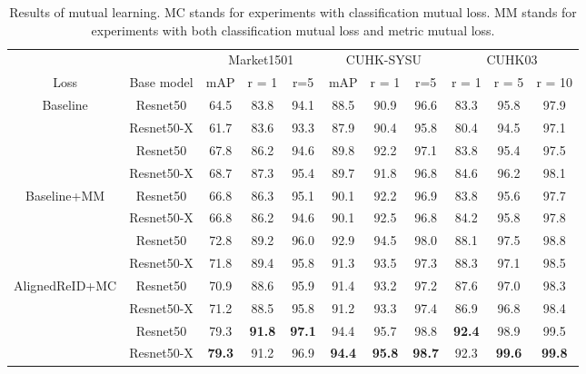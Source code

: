 \documentclass[10pt,twocolumn,letterpaper]{article}
\begin{document}
\renewcommand{\multirowsetup}{\centering}  
\begin{table*}[t]\small
  \begin{center}
  \begin{tabular}{ c|c|ccc|ccc|ccc}
\hline
    							&	 		& \multicolumn{3}{c|}{Market1501} & \multicolumn{3}{c|}{CUHK-SYSU}	& \multicolumn{3}{c}{CUHK03}	\\
  Loss						&Base model		& mAP 	& r = 1	&r=5 & mAP 	& r = 1	&r=5 & r = 1	&r = 5    &r = 10\\
 	\hline
	\hline
 \multirow{3}{2.3cm}{Baseline} 		&Resnet50	&64.5 	&83.8	&94.1	&88.5	&90.9	&96.6	&83.3	&95.8	&97.9	\\
   										&Resnet50-X	&61.7	&83.6	&93.3	&87.9 	&90.4	&95.8	&80.4	&94.5	&97.1	\\
   \hline
 \multirow{3}{2.3cm}{Baseline+MC} 	&Resnet50	&67.8  	& 86.2	& 94.6  & 89.8 	& 92.2	& 97.1	& 83.8 	& 95.4	& 97.5	\\
   										&Resnet50-X	&68.7 	&87.3	& 95.4	& 89.7 	& 91.8	& 96.8	& 84.6 	& 96.2	& 98.1   \\
   \hline
 \multirow{3}{2.3cm}{Baseline+MM}	&Resnet50	& 66.8 	& 86.3	&95.1	& 90.1 	& 92.2	& 96.9	& 83.8	&95.6 	&97.7\\
 	  						&Resnet50-X	& 66.8 	& 86.2	&94.6	& 90.1 	& 92.5	& 96.8	& 84.2	&95.8 	&97.8\\
 	\hline
	\hline
 \multirow{3}{2.3cm}{AlignedReID} 	&Resnet50	&72.8   &89.2   &96.0   &92.9   &94.5	&98.0	&88.1	&97.5	&98.8	\\
   							&Resnet50-X	&71.8   &89.4   &95.8   &91.3	&93.5   &97.3   &88.3   &97.1	&98.5\\
   \hline
 \multirow{3}{2.3cm}{AlignedReID+MC} &Resnet50	& 70.9 	& 88.6	& 95.9	& 91.4 	& 93.2	& 97.2	& 87.6 	& 97.0	& 98.3	\\
   							&Resnet50-X	& 71.2 	& 88.5	& 95.8	& 91.2 	& 93.3	& 97.4	& 86.9 	& 96.8	& 98.4	\\
   \hline
 \multirow{3}{2.3cm}{AlignedReID+MM}&Resnet50	& 79.3 	& \textbf{91.8}	& \textbf{97.1}	& 94.4 	& 95.7	& 98.8	& \textbf{92.4} 	& 98.9	& 99.5	\\
 	  						&Resnet50-X	& \textbf{79.3} 	& 91.2	& 96.9	& \textbf{94.4} 	& \textbf{95.8}	& \textbf{98.7}	& 92.3 	& \textbf{99.6}	& \textbf{99.8}	\\
   \hline
  \end{tabular}
  \end{center}
  \caption{\label{mutual}Results of mutual learning. MC stands for experiments with classification mutual loss. MM stands for experiments with both classification mutual loss and metric mutual loss.}
  \label{mutual}
\end{table*}
\end{document}
